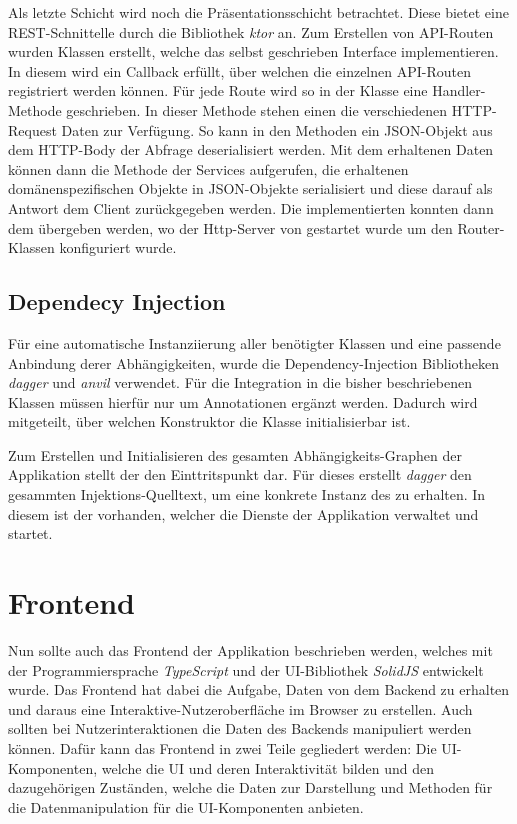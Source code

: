 Als letzte Schicht wird noch die Präsentationsschicht betrachtet. Diese bietet
eine REST-Schnittelle durch die Bibliothek \emph{ktor} an. Zum Erstellen von
API-Routen wurden Klassen erstellt, welche das selbst geschrieben 
Interface implementieren. In diesem wird ein Callback erfüllt, über welchen die einzelnen
API-Routen registriert werden können. Für jede Route wird so in der Klasse eine
Handler-Methode geschrieben. In dieser Methode stehen einen die verschiedenen
HTTP-Request Daten zur Verfügung. So kann in den Methoden \zb{} ein JSON-Objekt aus dem
HTTP-Body der Abfrage deserialisiert werden. Mit dem erhaltenen Daten können dann
die Methode der Services aufgerufen, die erhaltenen domänenspezifischen Objekte
in JSON-Objekte serialisiert und diese darauf als Antwort dem Client zurückgegeben werden.
Die implementierten  konnten dann dem  übergeben werden,
wo der Http-Server von  gestartet wurde um den Router-Klassen konfiguriert  wurde.

\subsection{Dependecy Injection}

Für eine automatische Instanziierung aller benötigter Klassen und eine passende
Anbindung derer Abhängigkeiten, wurde die Dependency-Injection Bibliotheken
\emph{dagger} und \emph{anvil} verwendet. Für die Integration in die bisher beschriebenen
Klassen müssen hierfür nur um Annotationen ergänzt werden. Dadurch wird mitgeteilt, über welchen
Konstruktor \zb{} die Klasse initialisierbar ist.

Zum Erstellen und Initialisieren des gesamten Abhängigkeits-Graphen der Applikation stellt der 
den Einttritspunkt dar. Für dieses erstellt \emph{dagger} den gesammten Injektions-Quelltext, um
eine konkrete Instanz des  zu erhalten. In diesem ist der 
vorhanden, welcher die Dienste der Applikation verwaltet und startet.

\section{Frontend}

Nun sollte auch das Frontend der Applikation beschrieben werden, welches mit
der Programmiersprache \emph{TypeScript} und der UI-Bibliothek \emph{SolidJS}
entwickelt wurde. Das Frontend hat dabei die Aufgabe, Daten von dem Backend zu
erhalten und daraus eine Interaktive-Nutzeroberfläche im Browser zu erstellen.
Auch sollten bei Nutzerinteraktionen die Daten des Backends manipuliert werden
können. Dafür kann das Frontend in zwei Teile gegliedert werden: Die
UI-Komponenten, welche die UI und deren Interaktivität bilden und den
dazugehörigen Zuständen, welche die Daten zur Darstellung und Methoden für die
Datenmanipulation für die UI-Komponenten anbieten.

